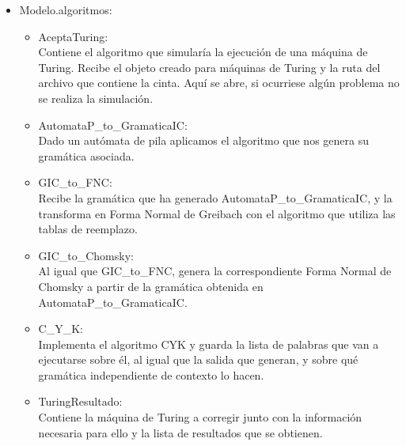 \documentclass[12pt,a4paper,spanish]{book}
\begin{document}
\begin{itemize}
\item Modelo.algoritmos:

\begin{itemize}
\item AceptaTuring:\\Contiene el algoritmo que simular\'ia la ejecuci\'on de una m\'aquina de Turing. Recibe el objeto creado para m\'aquinas de Turing y la ruta del archivo que contiene la cinta. Aqu\'i se abre, si ocurriese alg\'un problema no se realiza la simulaci\'on.
\item AutomataP\_to\_GramaticaIC:\\Dado un aut\'omata de pila aplicamos el algoritmo que nos genera su gram\'atica asociada.
\item GIC\_to\_FNC:\\Recibe la gram\'atica que ha generado AutomataP\_to\_GramaticaIC, y la transforma en Forma Normal de Greibach con el algoritmo que utiliza las tablas de reemplazo.
\item GIC\_to\_Chomsky:\\Al igual que GIC\_to\_FNC, genera la correspondiente Forma Normal de Chomsky a partir de la gram\'atica obtenida en AutomataP\_to\_GramaticaIC.
\item C\_Y\_K:\\ Implementa el algoritmo CYK y guarda la lista de palabras que van a ejecutarse sobre \'el, al igual que la salida que generan, y sobre qu\'e gram\'atica independiente de contexto lo hacen.
\item TuringResultado:\\Contiene la m\'aquina de Turing a corregir junto con la informaci\'on necesaria para ello y la lista de resultados que se obtienen.


\end{itemize}
\end{itemize}
\end{document}
